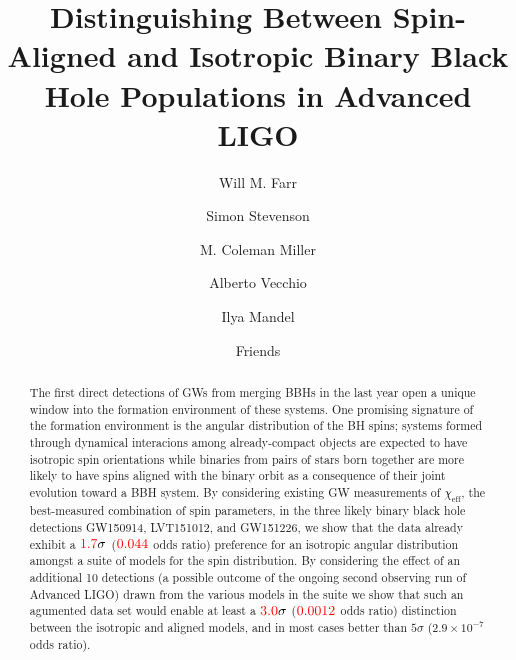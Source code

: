 \documentclass[modern]{aastex61}
\newcommand{\chieff}{\chi_\mathrm{eff}}
\newcommand{\checkme}[1]{\textcolor{red}{#1}}
\newcommand{\OOneSigmaIsoAligned}{\checkme{1.7}}
\newcommand{\OOneOddsIsoAligned}{\checkme{0.044}}
\newcommand{\OTwoSigmaIsoAlignedMin}{\checkme{3.0}}
\newcommand{\OTwoOddsIsoAlignedMin}{\checkme{0.0012}}
\begin{document}

\title{Distinguishing Between Spin-Aligned and Isotropic Binary Black
  Hole Populations in Advanced LIGO}

\author[0000-0003-1540-8562]{Will M. Farr}


\author[0000-0002-6100-537X]{Simon Stevenson}


\author{M. Coleman Miller}


\author[0000-0002-6254-1617]{Alberto Vecchio}


\author[0000-0002-6134-8946]{Ilya Mandel}


\author{Friends}


\begin{abstract}
  The first direct detections of \acp{GW} from merging \acp{BBH} in
  the last year open a unique window into the formation environment of
  these systems.  One promising signature of the formation environment
  is the angular distribution of the \ac{BH} spins; systems formed
  through dynamical interacions among already-compact objects are
  expected to have isotropic spin orientations while binaries from
  pairs of stars born together are more likely to have spins aligned
  with the binary orbit as a consequence of their joint evolution
  toward a \ac{BBH} system.  By considering existing \ac{GW}
  measurements of $\chieff$, the best-measured combination of spin
  parameters, in the three likely binary black hole detections
  GW150914, LVT151012, and GW151226, we show that the data already
  exhibit a $\OOneSigmaIsoAligned\sigma$ ($\OOneOddsIsoAligned$ odds
  ratio) preference for an isotropic angular distribution amongst a
  suite of models for the spin distribution.  By considering the
  effect of an additional 10 detections (a possible outcome of the
  ongoing second observing run of Advanced LIGO) drawn from the
  various models in the suite we show that such an agumented data set
  would enable at least a $\OTwoSigmaIsoAlignedMin\sigma$
  ($\OTwoOddsIsoAlignedMin$ odds ratio) distinction between the
  isotropic and aligned models, and in most cases better than
  $5\sigma$ ($2.9 \times 10^{-7}$ odds ratio).
\end{abstract}
\end{document}
